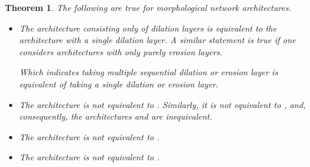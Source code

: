 \documentclass[12pt]{article}
\newtheorem{theorem}{Theorem}
\begin{document}
\begin{theorem}
The following are true for morphological  network architectures.
\begin{itemize}
    \item[(i)] The architecture  consisting only of dilation layers is equivalent to the architecture  with a single dilation layer. A similar statement is true if one considers architectures with only purely erosion layers.
    
    Which indicates taking multiple sequential dilation or erosion layer is equivalent  of taking a single dilation or erosion layer.  
    \item[(ii)] The architecture  is not equivalent to . Similarly, it is not equivalent to , and, consequently, the architectures  and  are inequivalent. 
    
    \item[(iii)] The architecture  is not equivalent to .
     \item[(iv)] The architecture  is not equivalent to .
\end{itemize}
\end{theorem}
\end{document}
